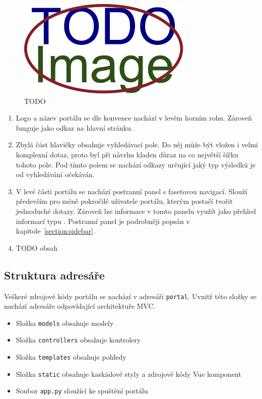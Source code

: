 \begin{figure}[H]
	\centering
	\includegraphics[width=\textwidth]{obrazky-figures/placeholder.pdf}
	\caption{TODO}
\end{figure}
\begin{enumerate}
    \item Logo a název portálu se dle konvence nachází v levém horním rohu. Zároveň funguje jako odkaz na hlavní stránku.
    \item Zbylá část hlavičky obsahuje vyhledávací pole. Do něj může být vložen i velmi komplexní dotaz, proto byl při návrhu kladen důraz na co největší šířku tohoto pole. Pod tímto polem se nachází odkazy určující jaký typ výsledků je od vyhledávání očekáván.
    \item V levé části portálu se nachází postranní panel s fasetovou navigací. Slouží především pro méně pokročilé uživatele portálu, kterým postačí tvořit jednoduché dotazy. Zároveň lze informace v tomto panelu využít jako přehled informací typu . Postranní panel je podrobněji popsán v kapitole~\ref{section:sidebar}.\
    \item TODO obsah
\end{enumerate}
\blindtext



\blindtext[2]

\subsection{Struktura adresáře}
Veškeré zdrojové kódy portálu se nachází v adresáři \texttt{portal}. Uvnitř této složky se nachází adresáře odpovídající architektuře MVC.
\begin{itemize}
  \item Složka \texttt{models} obsahuje modely
  \item Složka \texttt{controllers} obsahuje kontrolery
  \item Složka \texttt{templates} obsahuje pohledy
  \item Složka \texttt{static} obsahuje kaskádové styly a zdrojové kódy Vue komponent
  \item Soubor \texttt{app.py} sloužící ke spuštění portálu
\end{itemize}

